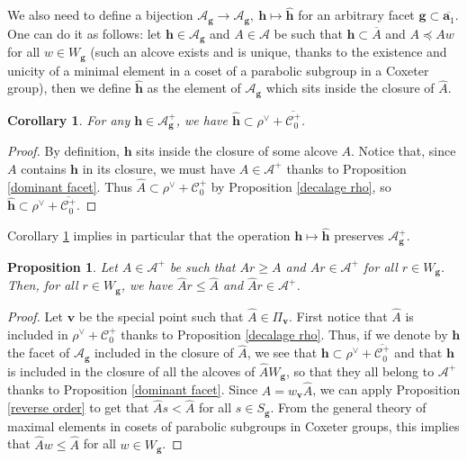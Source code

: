 \documentclass[11pt]{amsart}
\theoremstyle{plain}
\newtheorem{coro}[thm]{Corollary}
\newtheorem{prop}[thm]{Proposition}
\theoremstyle{remark}
\numberwithin{equation}{section}
\begin{document}
	We also need to define a bijection $\mathcal{A}_\mathbf{g}\to \mathcal{A}_\mathbf{g},~\mathbf{h}\mapsto\hat{\mathbf{h}}$ for an arbitrary facet $\mathbf{g}\subset \overline{\mathbf{a}_1}$. One can do it as follows: let $\mathbf{h}\in \mathcal{A}_\mathbf{g}$ and $A\in\mathcal{A}$ be such that $\mathbf{h}\subset\overline{A}$ and $A\preceq Aw$ for all $w\in W_\mathbf{g}$ (such an alcove exists and is unique, thanks to the existence and unicity of a minimal element in  a coset of a parabolic subgroup in a Coxeter group), then we define $\hat{\mathbf{h}}$ as the element of $\mathcal{A}_\mathbf{g}$ which sits inside the closure of $\hat{A}$.
	\begin{coro}\label{shifting facets}
		For any $\mathbf{h}\in\mathcal{A}_\mathbf{g}^+$, we have $\hat{\mathbf{h}}\subset \rho^\vee+\overline{\mathscr{C}^+_0}$.
	\end{coro}
	\begin{proof}
		By definition, $\mathbf{h}$ sits inside the closure of some alcove $A$. Notice that, since $A$ contains $\mathbf{h}$ in its closure, we must have $A\in\mathcal{A}^+$ thanks to Proposition \ref{dominant facet}. Thus $\hat{A}\subset \rho^\vee+\mathscr{C}^+_0$ by Proposition \ref{decalage rho}, so $\hat{\mathbf{h}}\subset \rho^\vee+\overline{\mathscr{C}^+_0}$.
	\end{proof}
	Corollary \ref{shifting facets} implies in particular that the operation $\mathbf{h}\mapsto\hat{\mathbf{h}}$ preserves $\mathcal{A}^+_\mathbf{g}$.
	\begin{prop}\label{hat transf}
		Let $A\in\mathcal{A}^+$ be such that $Ar\geq A$  and $Ar\in\mathcal{A}^+$ for all $r\in W_\mathbf{g}$. Then, for all $r\in W_\mathbf{g}$, we have $\hat{A}r\leq\hat{A}$ and $\hat{A}r\in\mathcal{A}^+$.
	\end{prop}
	\begin{proof}
		Let $\mathbf{v}$ be the special point such that $\hat{A}\in\Pi_\mathbf{v}$. First notice that $\hat{A}$ is included in $\rho^\vee+\mathscr{C}^+_0$ thanks to Proposition \ref{decalage rho}. Thus, if we denote by $\mathbf{h}$ the facet of $\mathcal{A}_\mathbf{g}$ included in the closure of $\hat{A}$, we see that $\mathbf{h}\subset \rho^\vee+\overline{\mathscr{C}^+_0}$ and that $\mathbf{h}$ is included in the closure of all the alcoves of $\hat{A}W_\mathbf{g}$, so that they all belong to $\mathcal{A}^+$ thanks to Proposition \ref{dominant facet}. Since $A=w_\mathbf{v}\hat{A}$, we can apply Proposition \ref{reverse order} to get that $\hat{A}s<\hat{A}$ for all $s\in S_\mathbf{g}$. From the general theory of maximal elements in cosets of parabolic subgroups in Coxeter groups, this implies that $\hat{A}w\leq\hat{A}$ for all $w\in W_\mathbf{g}$.
	\end{proof}
	
\end{document}

